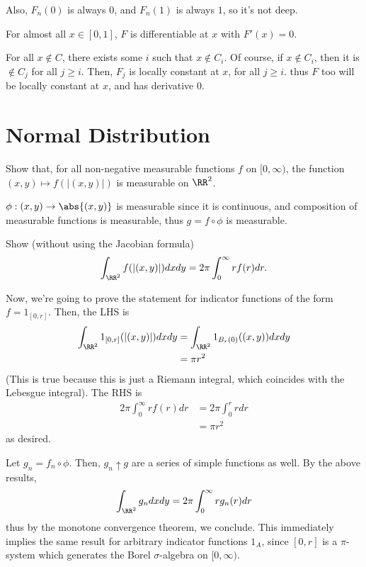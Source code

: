 \documentclass[11pt, headheight=30pt]{scrartcl}
\begin{document}
Also, $F_n(0)$ is always $0$,
and $F_n(1)$ is always $1$, so it's not deep.

\begin{prob}
    For almost all $x \in [0, 1]$, $F$ is differentiable at $x$ with $F'(x) = 0$.
\end{prob}
For all $x\notin C$, there exists
some $i$ such that $x\notin C_i$. Of course, if $x\notin C_i$,
then it is $\notin C_j$ for all $j\geq i$.
Then, $F_j$ is locally constant at $x$, for all $j\geq i$.
thus $F$ too will be locally constant at $x$,
and has derivative $0$. 


\section{Normal Distribution}
\begin{prob}
    Show that, for all non-negative measurable functions $f$ on $[0, \infty)$,
    the function
    $(x, y) \mapsto f(|(x, y)|)$ is measurable on $\RR^2$.
\end{prob}

$\phi: (x,y)\to \abs{(x,y)}$ is measurable since it is
continuous, and composition of measurable functions is
measurable, thus $g = f\circ \phi$ is measurable.

\begin{prob}
Show (without using the Jacobian formula)
\[
    \int_{\RR^2} f(|(x, y)|)dxdy = 2\pi \int_0^\infty rf(r)dr.
\]
\end{prob}

Now, we're going to prove the statement for
indicator functions of the form $f = 1_{[0, r]}$. Then, the LHS is
\begin{align*}
    \int_{\RR^2} 1_{[0, r]}(|(x, y)|)dxdy &= \int_{\RR^2} 1_{B_r(0)}((x, y))dxdy\\
    &= \pi r^2
\end{align*}
(This is true because this is just a Riemann integral, which coincides
with the Lebesgue integral). The RHS is
\begin{align*}
    2\pi \int_0^\infty rf(r)dr &= 2\pi \int_0^r rdr\\
    &= \pi r^2
\end{align*}
as desired.

Let $g_n = f_n\circ \phi$. Then, $g_n\uparrow g$ are
a series of simple functions as well. By the above results,
\[
    \int_{\RR^2} g_n dxdy = 2\pi \int_0^\infty rg_n(r)dr    
\]
thus by the monotone convergence theorem, we conclude.
This immediately implies the same result for arbitrary
indicator functions $1_A$, since $[0,r]$ is a $\pi$-system
which generates the Borel $\sigma$-algebra on $[0,\infty)$.
\end{document}
